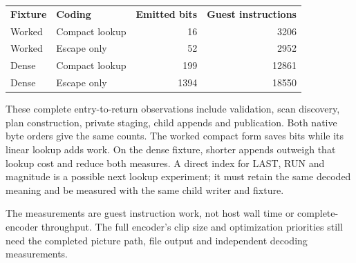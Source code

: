 \begin{center}
  \begin{tabular}{llrr}
    \textbf{Fixture} & \textbf{Coding} & \textbf{Emitted bits} & \textbf{Guest instructions} \\
    Worked           & Compact lookup  & 16                    & 3206                        \\
    Worked           & Escape only     & 52                    & 2952                        \\
    Dense            & Compact lookup  & 199                   & 12861                       \\
    Dense            & Escape only     & 1394                  & 18550
  \end{tabular}
\end{center}
These complete entry-to-return observations include validation, scan discovery,
plan construction, private staging, child appends and publication. Both native
byte orders give the same counts. The worked compact form saves bits while its
linear lookup adds work. On the dense fixture, shorter appends outweigh that
lookup cost and reduce both measures. A direct index for LAST, RUN and magnitude
is a possible next lookup experiment; it must retain the same decoded meaning
and be measured with the same child writer and fixture.

The measurements are guest instruction work, not host wall time or complete-encoder
throughput. The full encoder's clip size and optimization priorities still need
the completed picture path, file output and independent decoding measurements.
